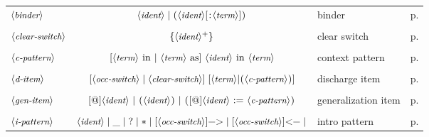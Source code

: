 \begin{longtable}{lclr}
$\langle\mbox{\itshape\rmfamily\small binder}\rangle$  & $\N{ident} \;|\; \C{(} \N{ident} [ \C{:} \N{term} ] \C{)}$ &
  binder& p. \pageref{ssec:pose}\\
\\
$\langle\mbox{\itshape\rmfamily\small clear-switch}\rangle$  & $\C{\{} \N{ident}^+ \C{\}}$ & clear switch &
p. \pageref{ssec:discharge}\\
\\
$\langle\mbox{\itshape\rmfamily\small c-pattern}\rangle$ &
  $[\N{term}\ \C{in}\ |\ \N{term}\ \C{as}]\ \N{ident}\ \C{in}\ \N{term}$
  & context pattern & p. \pageref{ssec:rewp} \\
\\
$\langle\mbox{\itshape\rmfamily\small d-item}\rangle$ & $[\N{occ-switch} \;|\; \N{clear-switch}]\;
  [\N{term}|\C{(}\N{c-pattern}\C{)}]$ &
discharge item &
p. \pageref{ssec:discharge}\\
\\
$\langle\mbox{\itshape\rmfamily\small gen-item}\rangle$  & $[\C{@}]\N{ident}\ |\ \C{(}\N{ident}\C{)}\ |\ \C{(}[\C{@}]\N{ident}\ \C{:=}\ \N{c-pattern}\C{)}$ & generalization item &
p. \pageref{ssec:struct}\\
\\
$\langle\mbox{\itshape\rmfamily\small i-pattern}\rangle$ & $\N{ident} \;|\; \C{_} \;|\; \C{?} \;|\; \C{*}\;|\;
  [\N{occ-switch}]\C{->} \;|\; [\N{occ-switch}]\C{<-} \;|$ &  intro pattern &
p. \pageref{ssec:intro}\\


\end{longtable}
